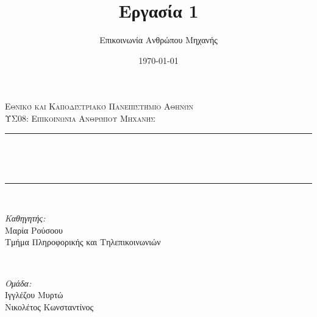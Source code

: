 \documentclass[12pt]{article}
\title{Εργασία 1}								%
\author{Επικοινωνία Ανθρώπου Μηχανής}								%
\date{\today}											%
\makeatletter
\let\thetitle\@title
\let\thedate\@date
\makeatother
\begin{document}

\begin{titlepage}
	\centering
    \vspace*{0.5 cm}
    \textsc{\LARGE \newline\newline Εθνικό και Καποδιστριακό Πανεπιστήμιο Αθηνών}\\[2.0 cm]	%
	\textsc{\Large ΥΣ08: Επικοινωνία Ανθρώπου Μηχανής}\\[0.5 cm]				%
	\rule{\linewidth}{0.2 mm} \\[0.4 cm]
	{ \huge \bfseries \thetitle}{\\
	\rule{\linewidth}{0.2 mm} \\[1.5 cm]
	
	\begin{minipage}{0.5\textwidth}
		\begin{flushleft} \large
			\emph{Καθηγητής:}\\
			Μαρία Ρούσοου\\
            Τμήμα Πληροφορικής και Τηλεπικοινωνιών\\
			\end{flushleft}
			\end{minipage}~
			\begin{minipage}{0.4\textwidth}
            
			\begin{flushright} \large
			\emph{Ομάδα:} \\
			Ιγγλέζου Μυρτώ\\
            Νικολέτος Κωνσταντίνος\\
		\end{flushright}
        
	\end{minipage}\\[2 cm]}
	
	
    \thedate

\end{titlepage}


\tableofcontents
\pagebreak

\end{document}
